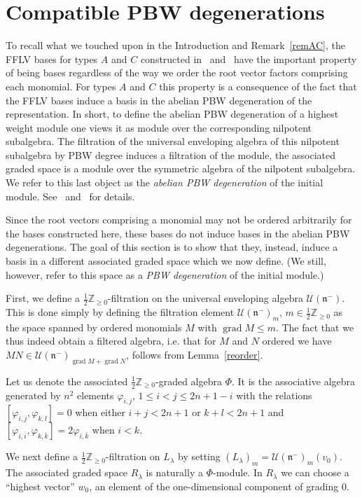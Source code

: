 \documentclass[ALCO,ThmDefs,Unicode]{cedram}
\DeclareMathOperator{\grad}{grad}
\newcommand{\la}{\lambda}
\begin{document}
\section{Compatible PBW degenerations}

To recall what we touched upon in the Introduction and Remark~\ref{remAC}, the FFLV bases for types $A$ and $C$ constructed in~\cite{FFL1} and~\cite{FFL2} have the important property of being bases regardless of the way we order the root vector factors comprising each monomial. For types $A$ and $C$ this property is a consequence of the fact that the FFLV bases induce a basis in the abelian PBW degeneration of the representation. In short, to define the abelian PBW degeneration of a highest weight module one views it as module over the corresponding nilpotent subalgebra. The filtration of the universal enveloping algebra of this nilpotent subalgebra by PBW degree induces a filtration of the module, the associated graded space is a module over the symmetric algebra of the nilpotent subalgebra. We refer to this last object as the \emph{abelian PBW degeneration} of the initial module. See~\cite{FFL1} and~\cite{FFL2} for details.

Since the root vectors comprising a monomial may not be ordered arbitrarily for the bases constructed here, these bases do not induce bases in the abelian PBW degenerations. The goal of this section is to show that they, instead, induce a basis in a different associated graded space which we now define. (We still, however, refer to this space as a \emph{PBW degeneration} of the initial module.)

First, we define a $\frac12\mathbb Z_{\ge 0}$-filtration on the universal enveloping algebra $\mathcal U(\mathfrak n^-)$. This is done simply by defining the filtration element $\mathcal U(\mathfrak n^-)_m$, $m\in\frac12\mathbb Z_{\ge 0}$ as the space spanned by ordered monomials $M$ with $\grad M\le m$. The fact that we thus indeed obtain a filtered algebra, i.e. that for $M$ and $N$ ordered we have $MN\in\mathcal U(\mathfrak n^-)_{\grad M+\grad N}$, follows from Lemma~\ref{reorder}.

Let us denote the associated $\frac12\mathbb Z_{\ge 0}$-graded algebra $\Phi$. It is the associative algebra generated by $n^2$ elements $\varphi_{i,j}$, $1\le i<j\le 2n+1-i$ with the relations $[\varphi_{i,j},\varphi_{k,l}]=0$ when either $i+j<2n+1$ or $k+l<2n+1$ and $[\varphi_{i,\overline i},\varphi_{k,\overline k}]=2\varphi_{i,\overline k}$ when $i<k$.

We next define a $\frac12\mathbb Z_{\ge 0}$-filtration on $L_\la$ by setting $(L_\la)_m=\mathcal U(\mathfrak n^-)_m(v_0)$. The associated graded space $R_\lambda$ is naturally a $\Phi$-module. In $R_\lambda$ we can choose a ``highest vector'' $w_0$, an element of the one-dimensional component of grading 0.
\end{document}
